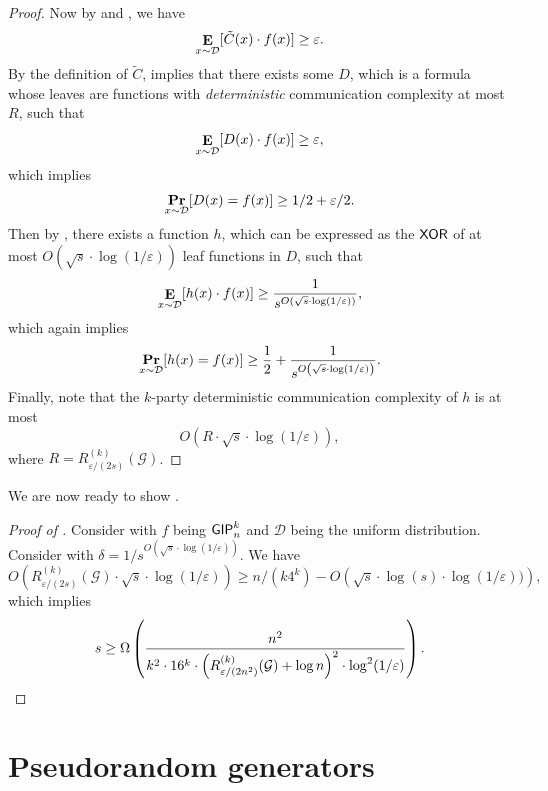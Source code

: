 \documentclass[10pt,a4paper]{article}
\DeclareMathOperator*\Exp{{\bf E}}
\DeclareMathOperator*\Prob{{\bf Pr}}
\newcommand{\XOR}{{\sf XOR}}
\newcommand{\GIP}{{\sf GIP}}
\begin{document}
\begin{proof}
        Now by  and , we have
        \begin{equation}\label{eq:lb-eq-1}
	        \Exp_{x\sim\mathcal{D}}[\tilde{C}(x)\cdot f(x)]\geq \varepsilon.
        \end{equation}
        By the definition of $\tilde{C}$,  implies that there exists some $D$, which is a formula whose leaves are functions with \emph{deterministic} communication complexity at most $R$, such that
        \[
            \Exp_{x\sim\mathcal{D}}[D(x)\cdot f(x)]\geq \varepsilon,
        \]
        which implies
        \[
            \Prob_{x\sim\mathcal{D}}[D(x)=f(x)]\geq 1/2+ \varepsilon/2.
        \]
        Then by , there exists a function $h$, which can be expressed as the $\XOR$ of at most $O(\sqrt{s}\cdot\log(1/\varepsilon))$ leaf functions in $D$, such that
        \[
            \Exp_{x\sim\mathcal{D}}[h(x)\cdot f(x)]\geq \frac{1}{s^{O(\sqrt{s}\cdot\log(1/\varepsilon))}},
        \]
        which again implies
        \[
            \Prob_{x\sim\mathcal{D}}[h(x)=f(x)]\geq \frac{1}{2} + \frac{1}{s^{O\left(\sqrt{s}\cdot\log(1/\varepsilon)\right)}}.
        \]
        Finally, note that the $k$-party deterministic communication complexity of $h$ is at most 
        \[
            O(R\cdot\sqrt{s}\cdot\log(1/\varepsilon)),
        \]
        where $R=R^{(k)}_{\varepsilon/(2s)}(\mathcal{G})$.
    \end{proof}
    
    We are now ready to show .
    
    \begin{proof}[Proof of ]
        Consider  with $f$ being $\GIP_{n}^{k}$ and $\mathcal{D}$ being the uniform distribution. Consider  with $\delta=1/s^{O(\sqrt{s}\cdot\log(1/\varepsilon))}$. We have
        \[
            O\left(R^{(k)}_{\varepsilon/(2s)}(\mathcal{G})\cdot\sqrt{s}\cdot\log(1/\varepsilon)\right)\geq n/(k4^k) - O\left(\sqrt{s}\cdot\log(s)\cdot\log(1/\varepsilon))\right),
        \]
        which implies
        \[
            s\geq \Omega\left( \frac{n^2}{k^2\cdot 16^{k}\cdot\left(R^{(k)}_{\varepsilon/(2n^2)}(\mathcal{G})+\log n\right)^2\cdot\log^2(1/\varepsilon)}\right).\qedhere
        \]
    \end{proof}
	

	\section{Pseudorandom generators}\label{sec:prgs}
	
\end{document}
